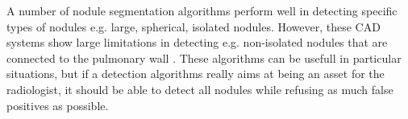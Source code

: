 A number of nodule segmentation algorithms perform well in detecting specific
types of nodules e.g. large, spherical, isolated nodules. However, these CAD
systems show large limitations in detecting e.g. non-isolated nodules that are
connected to the pulmonary wall \cite{keshani}. These algorithms can be usefull
in particular situations, but if a detection algorithms really aims at being an
asset for the radiologist, it should be able to detect all nodules while
refusing as much false positives as possible.






